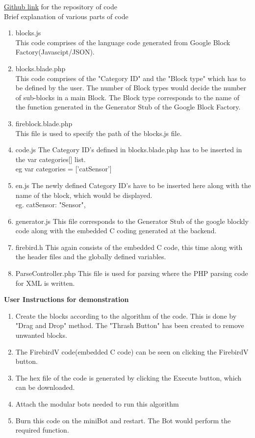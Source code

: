 \documentclass[a4paper,12pt,oneside]{book}
\begin{document}
\href{http://www.github.com}{Github link} for the repository of code\\
Brief explanation of various parts of code 
\begin{enumerate}
    \item blocks.js\\
    This code comprises of the language code generated from Google Block Factory(Javascipt/JSON).
    \item blocks.blade.php\\
    This code comprises of the "Category ID" and the "Block type" which has to be defined by the user. The number of Block types would decide the number of sub-blocks in a main Block. The Block type corresponds to the name of the function generated in the Generator Stub of the Google Block Factory.
    \item fireblock.blade.php\\
    This file is used to specify the path of the blocks.js file.
    \item code.js
    The Category ID's defined in blocks.blade.php has to be inserted in the var categories[] list.\\
    eg var categories = ['catSensor']
    \item en.js
    The newly defined Category ID's have to be inserted here along with the name of the block, which would be displayed.\\
    eg. catSensor: "Sensor",
    \item generator.js
    This file corresponds to the Generator Stub of the google blockly code along with the embedded C coding generated at the backend.
    \item firebird.h
    This again consists of the embedded C code, this time along with the header files and the globally defined variables.
    \item ParseController.php
    This file is used for parsing where the PHP parsing code for XML is written.
\end{enumerate}

\textbf{User Instructions for demonstration}
\begin{enumerate}
    \item Create the blocks according to the algorithm of the code. This is done by "Drag and Drop" method. The "Thrash Button" has been created to remove unwanted blocks.
    \item The FirebirdV code(embedded C code) can be seen on clicking the FirebirdV button.
    \item The hex file of the code is generated by clicking the Execute button, which can be downloaded.
    \item Attach the modular bots needed to run this algorithm
    \item Burn this code on the miniBot and restart. The Bot would perform the required function.
\end{enumerate}
\end{document}
